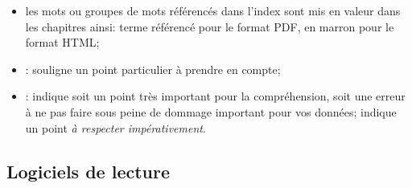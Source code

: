 \begin{itemize}
	\item les mots ou groupes de mots référencés dans l'index sont mis en valeur dans les chapitres ainsi:
		\newline
		\hspace*{1.5cm}\textopenbullet{} \textsf{terme référencé} pour le format \gls{PDF},
		\newline
		\hspace*{1.5cm}\textopenbullet{} en marron pour le format \gls{HTML};
	\item \Note{}: souligne un point particulier à prendre en compte;
	\item \Attention{}: indique soit un point très important pour la compréhension, soit une erreur à ne pas faire sous peine de dommage important pour vos données;\newline
	\Attention{} indique un point \emph{à respecter impérativement}.
\end{itemize} 



\subsection{Logiciels de lecture\label{introduction-manual-readers}}

